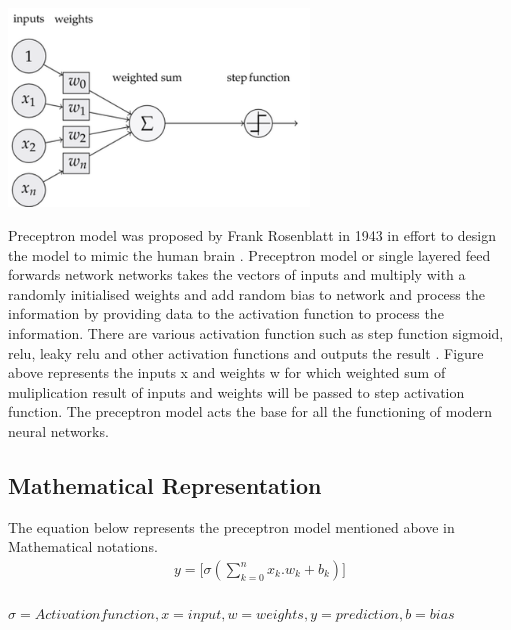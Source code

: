 
\begin{center}
    \includegraphics[width=0.6\textwidth]{Images/p_model.png} \\
\end{center}
\vspace{2mm}
Preceptron model was proposed by Frank Rosenblatt in 1943 in effort to design the model to 
mimic the human brain \citep*{939589}. Preceptron model or single layered feed forwards network 
networks takes the vectors of inputs and multiply with a randomly 
initialised weights and add random bias to network and process the information by providing data to the activation function to process the information.
There are various activation function such as  step function sigmoid, 
relu, leaky relu and other activation functions and outputs the result \citep{AGATONOVICKUSTRIN2000717}.
Figure above represents the inputs x and weights w for which weighted sum of muliplication result of 
inputs and weights will be passed to step activation function. The preceptron model acts the base for all the 
functioning of modern neural networks.

\subsection{Mathematical Representation }
\vspace{3mm}
{The equation below represents the preceptron model mentioned above in Mathematical notations.}
\begin{equation}
    \begin{split}
        y = \Big[\sigma(\sum_{k=0}^n x_k.w_k + b_k)\Big] \\
    \end{split}
\end{equation}

$ {\sigma = Activation function ,
        x = input , 
        w = weights ,
        y = prediction , 
        b = bias
    } $ 

